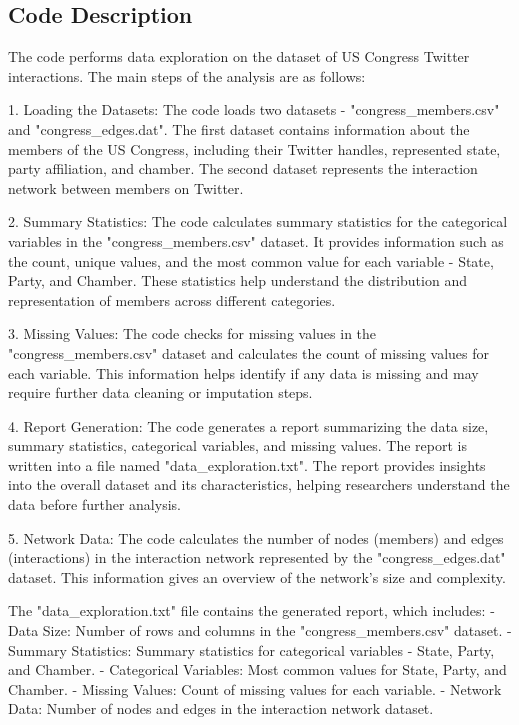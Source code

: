 \documentclass[11pt]{article}
\begin{document}
\subsection{Code Description}

The code performs data exploration on the dataset of US Congress Twitter interactions. The main steps of the analysis are as follows:

1. Loading the Datasets: 
   The code loads two datasets - "congress\_members.csv" and "congress\_edges.dat". The first dataset contains information about the members of the US Congress, including their Twitter handles, represented state, party affiliation, and chamber. The second dataset represents the interaction network between members on Twitter.

2. Summary Statistics: 
   The code calculates summary statistics for the categorical variables in the "congress\_members.csv" dataset. It provides information such as the count, unique values, and the most common value for each variable - State, Party, and Chamber. These statistics help understand the distribution and representation of members across different categories.

3. Missing Values:
   The code checks for missing values in the "congress\_members.csv" dataset and calculates the count of missing values for each variable. This information helps identify if any data is missing and may require further data cleaning or imputation steps.

4. Report Generation:
   The code generates a report summarizing the data size, summary statistics, categorical variables, and missing values. The report is written into a file named "data\_exploration.txt". The report provides insights into the overall dataset and its characteristics, helping researchers understand the data before further analysis.

5. Network Data:
   The code calculates the number of nodes (members) and edges (interactions) in the interaction network represented by the "congress\_edges.dat" dataset. This information gives an overview of the network's size and complexity.

The "data\_exploration.txt" file contains the generated report, which includes:
- Data Size: Number of rows and columns in the "congress\_members.csv" dataset.
- Summary Statistics: Summary statistics for categorical variables - State, Party, and Chamber.
- Categorical Variables: Most common values for State, Party, and Chamber.
- Missing Values: Count of missing values for each variable.
- Network Data: Number of nodes and edges in the interaction network dataset.
\end{document}
